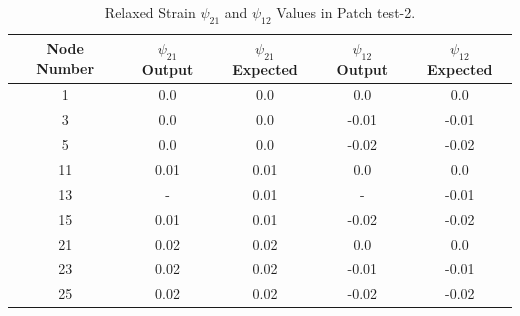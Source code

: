 \documentclass[12pt]{article}
\begin{document}
\begin{table}
	\begin{center}
		\begin{tabular}{||c c c c c||} 
			\hline
			Node Number & $\psi_{21}$ Output & $\psi_{21}$ Expected  & $\psi_{12}$ Output & $\psi_{12}$ Expected \\ [0.8ex] 
			\hline\hline
			1 & 0.0 & 0.0 & 0.0 & 0.0  \\ 
			[0.8ex]
			\hline
			3 & 0.0 & 0.0 & -0.01 & -0.01  \\ 
			[0.8ex]
			\hline
			5 & 0.0 & 0.0 & -0.02 & -0.02   \\ 
			[0.8ex]
			\hline
			11 & 0.01 & 0.01 & 0.0 & 0.0   \\ 
			[0.8ex]
			\hline	
			\rowcolor{lightgray} 13 & - & 0.01 & - & -0.01  \\ 
			[0.8ex]
			\hline
			15 & 0.01 & 0.01 & -0.02 & -0.02  \\ 
			[0.8ex]
			\hline
			21 & 0.02 & 0.02 & 0.0 & 0.0  \\ 
			[0.8ex]
			\hline
			23 & 0.02 & 0.02 & -0.01 & -0.01  \\ 
			[0.8ex]
			\hline	
			25 & 0.02 & 0.02 & -0.02 & -0.02   \\ 
			[0.8ex]
			\hline
		\end{tabular}
		\caption{Relaxed Strain $\psi_{21}$ and $\psi_{12}$ Values in Patch test-2.}
	\end{center}
\end{table}
\end{document}

